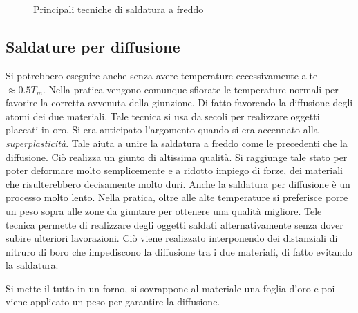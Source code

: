 \begin{figure}
\centering
{}\quad
{}\quad
{}\\
\quad
{}\\
\caption{Principali tecniche di saldatura a freddo}
\label{fig:CW}
\end{figure}

\subsection{Saldature per diffusione}
Si potrebbero eseguire anche senza avere temperature eccessivamente alte $\approx 0.5 T_m$. Nella pratica vengono comunque sfiorate le temperature normali per favorire la corretta avvenuta della giunzione.
Di fatto favorendo la diffusione degli atomi dei due materiali.
Tale tecnica si usa da secoli per realizzare oggetti placcati in oro.
Si era anticipato l'argomento quando si era accennato alla \textit{superplasticità}. Tale aiuta a unire la saldatura a freddo come le precedenti che la diffusione. Ciò realizza un giunto di altissima qualità.
Si raggiunge tale stato per poter deformare molto semplicemente e a ridotto impiego di forze, dei materiali che risulterebbero decisamente molto duri.
Anche la saldatura per diffusione è un processo molto lento.
Nella pratica, oltre alle alte temperature si preferisce porre un peso sopra alle zone da giuntare per ottenere una qualità migliore.
Tele tecnica permette di realizzare degli oggetti saldati alternativamente senza dover subire ulteriori lavorazioni. Ciò viene realizzato interponendo dei distanziali di nitruro di boro che impediscono la diffusione tra i due materiali, di fatto evitando la saldatura.

Si mette il tutto in un forno, si sovrappone al materiale una foglia d'oro e poi viene applicato un peso per garantire la diffusione.

